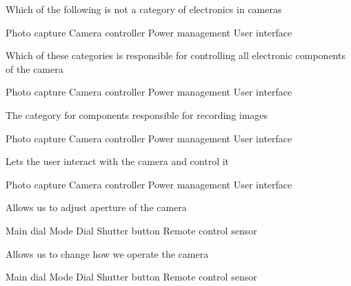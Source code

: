\documentclass[theme=sleek, randomorder, hidesidemenu]{webquiz}
\begin{document}
\begin{question}
  Which of the following is not a category of electronics in cameras
  \begin{choice}[columns=2]
    \incorrect Photo capture
    \incorrect Camera controller
    \correct   Power management
    \incorrect User interface
  \end{choice}
\end{question}

\begin{question}
  Which of these categories is responsible for controlling all electronic components of the camera
  \begin{choice}[columns=2]
    \incorrect Photo capture
    \correct Camera controller
    \incorrect   Power management
    \incorrect User interface
  \end{choice}
\end{question}

\begin{question}
  The category for components responsible for recording images
  \begin{choice}[columns=2]
    \incorrect Photo capture
    \correct Camera controller
    \incorrect   Power management
    \incorrect User interface
  \end{choice}
\end{question}

\begin{question}
  Lets the user interact with the camera and control it
  \begin{choice}[columns=2]
    \incorrect Photo capture
    \incorrect Camera controller
    \incorrect   Power management
    \correct User interface
  \end{choice}
\end{question}

\begin{question}
  Allows us to adjust aperture of the camera
  \begin{choice}[columns=2]
    \correct Main dial
    \incorrect Mode Dial
    \incorrect Shutter button
    \incorrect Remote control sensor
  \end{choice}
\end{question}

\begin{question}
  Allows us to change how we operate the camera
  \begin{choice}[columns=2]
    \incorrect Main dial
    \correct Mode Dial
    \incorrect Shutter button
    \incorrect Remote control sensor
  \end{choice}
\end{question}
\end{document}
